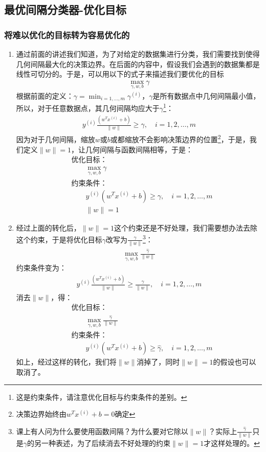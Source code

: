 \subsection{最优间隔分类器-优化目标}
\subsubsection{将难以优化的目标转为容易优化的}
\begin{enumerate}
	\item 通过前面的讲述我们知道，为了对给定的数据集进行分类，我们需要找到使得几何间隔最大化的决策边界。在后面的内容中，假设我们会遇到的数据集都是线性可切分的。于是，可以用以下的式子来描述我们要优化的目标
	\begin{align}
		\max_{\gamma, w, b} \gamma
	\end{align}
	根据前面的定义：$\gamma = \min_{i=1,\dots,m}\gamma^{(i)}$，$\gamma$是所有数据点中几何间隔最小值，所以，对于任意数据点，其几何间隔均应大于$\gamma$\footnote{这是约束条件，请注意优化目标与约束条件的差别。}：
	\begin{align}
		y^{(i)}\frac{(w^Tx^{(i)}+b)}{\|w\|} \geq \gamma, \quad i=1, 2, \dots, m
	\end{align}
	因为对于几何间隔，缩放$w$或$b$或都缩放不会影响决策边界的位置\footnote{决策边界始终由$w^Tx^{(i)}+b=0$确定}，于是，我们定义$\|w\|=1$，让几何间隔与函数间隔相等，于是：
	\begin{align}
		&\text{优化目标：} \\
		& \qquad \max_{\gamma, w, b} \gamma \\
		&\text{约束条件：} \\
		& \qquad y^{(i)}(w^Tx^{(i)}+b) \geq \gamma, \quad i=1, 2, \dots, m \\
		& \qquad \|w\| = 1
	\end{align}

	\item 经过上面的转化后，$\|w\|=1$这个约束还是不好处理，我们需要想办法去除这个约束，于是将优化目标$\gamma$改写为$\frac{\hat{\gamma}}{\|w\|}$\footnote{课上有人问为什么要使用函数间隔？为什么要对它除以$\|w\|$？实际上$\frac{\hat{\gamma}}{\|w\|}$只是$\gamma$的另一种表述，为了后续消去不好处理的约束$\|w\| = 1$才这样处理的。}：
	\begin{align}
		\max_{\gamma, w, b} \frac{\hat{\gamma}}{\|w\|}
	\end{align}
	约束条件变为：
	\begin{align}
		y^{(i)}\frac{(w^Tx^{(i)}+b)}{\|w\|} \geq \frac{\hat{\gamma}}{\|w\|}, \quad i=1, 2, \dots, m
	\end{align}
	消去$\|w\|$，得：
	\begin{align}
		&\text{优化目标：} \\
		& \qquad \max_{\gamma, w, b} \frac{\hat{\gamma}}{\|w\|} \\
		&\text{约束条件：} \\
		& \qquad y^{(i)}(w^Tx^{(i)}+b) \geq \hat{\gamma}, \quad i=1, 2, \dots, m
	\end{align}
	如上，经过这样的转化，我们将$\|w\|$消掉了，同时$\|w\| = 1$的假设也可以取消了。


\end{enumerate}
